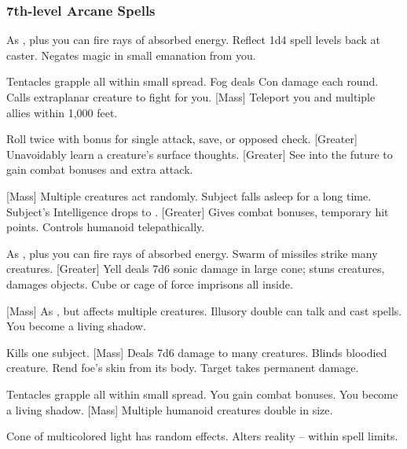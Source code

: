 \subsubsection{7th-level Arcane Spells}
\begin{swspelllist}
     As , plus you can fire rays of absorbed energy.
     Reflect 1d4 spell levels back at caster.
     Negates magic in small emanation from you.

     Tentacles grapple all within small spread.
     Fog deals Con damage each round.
     Calls extraplanar creature to fight for you.
    [Mass] Teleport you and multiple allies within 1,000 feet.

     Roll twice with bonus for single attack, save, or opposed check.
    [Greater] Unavoidably learn a creature's surface thoughts.
    [Greater] See into the future to gain combat bonuses and extra attack.

    [Mass] Multiple creatures act randomly.
     Subject falls asleep for a long time.
     Subject's Intelligence drops to .
    [Greater] Gives combat bonuses, temporary hit points.
     Controls humanoid telepathically.

     As , plus you can fire rays of absorbed energy.
     Swarm of missiles strike many creatures.
    [Greater] Yell deals 7d6 sonic damage in large cone; stuns creatures, damages objects.
    \M Cube or cage of force imprisons all inside.

    [Mass] As , but affects multiple creatures.
     Illusory double can talk and cast spells.
     You become a living shadow.
    \spellhead*{}

     Kills one subject.
    [Mass] Deals 7d6 damage to many creatures.
     Blinds bloodied creature.
     Rend foe's skin from its body.
     Target takes permanent damage.

     Tentacles grapple all within small spread.
    \M You gain combat bonuses.
     You become a living shadow.
    [Mass] Multiple humanoid creatures double in size.

     Cone of multicolored light has random effects.
    \M Alters reality -- within spell limits.
\end{swspelllist}

